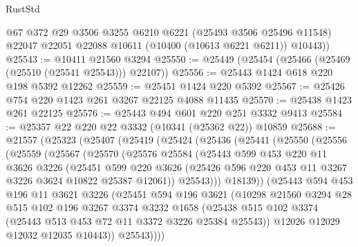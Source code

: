 \begin{lexlean}{RustStd}
\begin{coremodule}
{\begin{coremodule}
{{{{{{{{{{{{{{{{{{{{{{{{{        @67
        @372
        @29
        @3506
        @3255
        @6210
        @6221
        (@25493 @3506 @25496 @11548)
        @22047
        @22051
        @22088
        @10611
        (@10400 (@10613 @6221 @6211))
        @10443))
@25543 := @10411 @21560 @3294
@25550 := @25449 (@25454 (@25466 (@25469 (@25510 (@25541 @25543))) @22107))
@25556 := @25443 @1424 @618 @220 @198 @5392 @12262
@25559 := @25451 @1424 @220 @5392
@25567 := @25426 @754 @220 @1423 @261 @3267 @22125 @4088 @11435
@25570 := @25438 @1423 @261 @22125
@25576 := @25443 @494 @601 @220 @251 @3332 @9413
@25584 := @25357 @22 @220 @22 @3332 (@10341 (@25362 @22)) @10859
@25688 := @21557
    (@25323
      (@25407
        (@25419
          (@25424
            (@25436
              (@25441
                (@25550
                  (@25556
                    (@25559
                      (@25567
                        (@25570
                          (@25576
                            @25584
                            (@25443
                              @599
                              @453
                              @220
                              @11
                              @3626
                              @3226
                              (@25451
                                @599
                                @220
                                @3626
                                (@25426 @596 @220 @453 @11 @3267 @3226 @3624 @10822 @25387 @12061))
                              @25543)))
                        @18139))
                    (@25443
                      @594
                      @453
                      @196
                      @11
                      @3621
                      @3226
                      (@25451
                        @594
                        @196
                        @3621
                        (@10298
                          @21560
                          @3294
                          @28
                          @515
                          @102
                          @196
                          @3267
                          @3374
                          @3232
                          @1658
                          (@25438
                            @515
                            @102
                            @3374
                            (@25443 @513 @453 @72 @11 @3372 @3226 @25384 @25543))
                          @12026
                          @12029
                          @12032
                          @12035
                          @10443))
                      @25543))))
}}}}}}}}}}}}}}}}}}}}}}}}}
\end{coremodule}}
\end{coremodule}
\end{lexlean}
